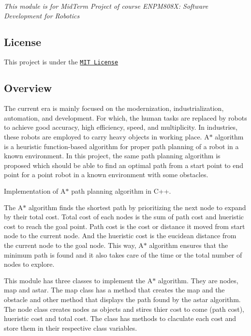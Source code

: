 {\itshape This module is for Mid\+Term Project of course E\+N\+P\+M808X\+: Software Development for Robotics}

\href{https://travis-ci.org/ysshah95/Astar-Algorithm-for-ACME-Robotics}{\tt } \href{https://coveralls.io/github/ysshah95/Astar-Algorithm-for-ACME-Robotics?branch=master}{\tt } \subsection*{\href{https://opensource.org/licenses/MIT}{\tt } }

\subsection*{License}

This project is under the \href{./LICENSE}{\tt M\+IT License}

\subsection*{Overview}

The current era is mainly focused on the modernization, industrialization, automation, and development. For which, the human tasks are replaced by robots to achieve good accuracy, high efficiency, speed, and multiplicity. In industries, these robots are employed to carry heavy objects in working place. A$\ast$ algorithm is a heuristic function-\/based algorithm for proper path planning of a robot in a known environment. In this project, the same path planning algorithm is proposed which should be able to find an optimal path from a start point to end point for a point robot in a known environment with some obstacles.

Implementation of A$\ast$ path planning algorithm in C++.

The A$\ast$ algorithm finds the shortest path by prioritizing the next node to expand by their total cost. Total cost of each nodes is the sum of path cost and hueristic cost to reach the goal point. Path cost is the cost or distance it moved from start node to the current node. And the hueristic cost is the eucidean distance from the current node to the goal node. This way, A$\ast$ algorithm ensures that the minimum path is found and it also takes care of the time or the total number of nodes to explore.

This module has three classes to implement the A$\ast$ algorithm. They are nodes, map and astar. The map class has a method that creates the map and the obstacle and other method that displays the path found by the astar algorithm. The node class creates nodes as objects and stires thier cost to come (path cost), hueristic cost and total cost. The class has methods to claculate each cost and store them in their respective class variables.

